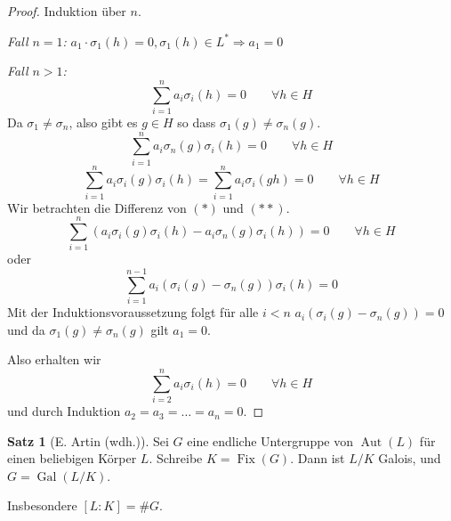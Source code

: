 \documentclass[12pt,parskip=full]{scrartcl}
\DeclareMathOperator{\Gal}{Gal}
\theoremstyle{definition}
\newtheorem{theorem}{Satz}[section]
\theoremstyle{remark}
\begin{document}
	\begin{proof}
		Induktion über $n$.
		
		\textit{Fall $n = 1$:} $a_1 \cdot \sigma_1(h) = 0, \sigma_1(h) \in L^* \Rightarrow a_1 = 0$
		
		\textit{Fall $n > 1$:}
		\begin{equation*}
			\sum_{i = 1}^n a_i \sigma_i(h) = 0 \qquad \forall h \in H
		\end{equation*}
		Da $\sigma_1 \neq \sigma_n$, also gibt es $g \in H$ so dass $\sigma_1(g) \neq \sigma_n(g)$.
		\begin{equation*}
			\sum_{i = 1}^n a_i \sigma_n(g) \sigma_i(h) = 0 \qquad \forall h \in H \tag{$*$}
		\end{equation*}
		\begin{equation*}
			\sum_{i = 1}^n a_i \sigma_i(g) \sigma_i(h) = \sum_{i = 1}^n a_i \sigma_i(gh) = 0 \qquad \forall h \in H \tag{$**$}
		\end{equation*}
		Wir betrachten die Differenz von $(*)$ und $(**)$.
		\begin{equation*}
			\sum_{i = 1}^n (a_i \sigma_i(g) \sigma_i(h) - a_i \sigma_n(g) \sigma_i(h)) = 0 \qquad \forall h \in H
		\end{equation*}
		oder
		\begin{equation*}
			\sum_{i = 1}^{n-1} a_i(\sigma_i(g) - \sigma_n(g)) \sigma_i(h) = 0
		\end{equation*}
		Mit der Induktionsvoraussetzung folgt für alle $i < n$ $a_i(\sigma_i(g) - \sigma_n(g)) = 0$ und da $\sigma_1(g) \neq \sigma_n(g)$ gilt $a_1 = 0$.
		
		Also erhalten wir
		\begin{equation*}
			\sum_{i = 2}^n a_i \sigma_i(h) = 0 \qquad \forall h \in H
		\end{equation*}
		und durch Induktion $a_2 = a_3 = \dots = a_n = 0$.
	\end{proof}

	\begin{theorem}[E. Artin (wdh.)]
		Sei $G$ eine endliche Untergruppe von $\operatorname{Aut}(L)$ für einen beliebigen Körper $L$. Schreibe $K = \operatorname{Fix}(G)$. Dann ist $L/K$ Galois, und $G = \Gal(L/K)$.
		
		Insbesondere $[L:K] = \#G$.
	\end{theorem}
\end{document}
